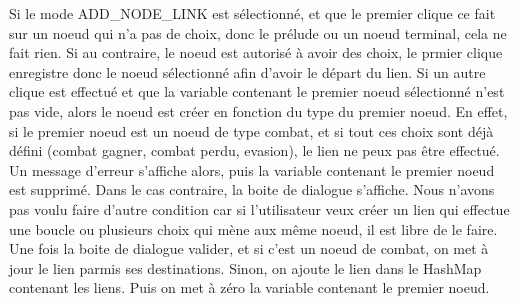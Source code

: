 				Si le mode ADD\_NODE\_LINK est sélectionné, et que le premier clique ce fait sur un noeud qui n'a pas de choix, donc le prélude ou un noeud terminal, cela ne fait rien. Si au contraire, le noeud est autorisé à avoir des choix, le prmier clique enregistre donc le noeud sélectionné afin d'avoir le départ du lien. Si un autre clique est effectué et que la variable contenant le premier noeud sélectionné n'est pas vide, alors le noeud est créer en fonction du type du premier noeud. En effet, si le premier noeud est un noeud de type combat, et si tout ces choix sont déjà défini (combat gagner, combat perdu, evasion), le lien ne peux pas être effectué. Un message d'erreur s'affiche alors, puis la variable contenant le premier noeud est supprimé. Dans le cas contraire, la boite de dialogue s'affiche. Nous n'avons pas voulu faire d'autre condition car si l'utilisateur veux créer un lien qui effectue une boucle ou plusieurs choix qui mène aux même noeud, il est libre de le faire.
				Une fois la boite de dialogue valider, et si c'est un noeud de combat, on met à jour le lien parmis ses destinations. Sinon, on ajoute le lien dans le HashMap contenant les liens. Puis on met à zéro la variable contenant le premier noeud.

